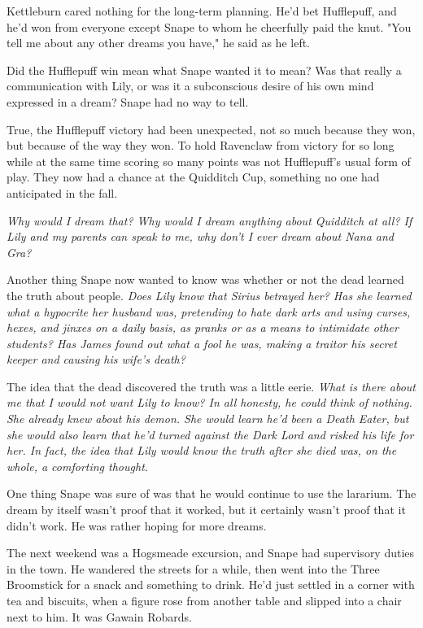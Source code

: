 \documentclass[a4paper,11pt]{article}
\begin{document}
Kettleburn cared nothing for the long-term planning. He'd bet Hufflepuff, and he'd won from everyone except Snape to whom he cheerfully paid the knut. "You tell me about any other dreams you have," he said as he left.

Did the Hufflepuff win mean what Snape wanted it to mean? Was that really a communication with Lily, or was it a subconscious desire of his own mind expressed in a dream? Snape had no way to tell.

True, the Hufflepuff victory had been unexpected, not so much because they won, but because of the way they won. To hold Ravenclaw from victory for so long while at the same time scoring so many points was not Hufflepuff's usual form of play. They now had a chance at the Quidditch Cup, something no one had anticipated in the fall.

\emph{Why would I dream that? Why would I dream anything about Quidditch at all? If Lily and my parents can speak to me, why don't I ever dream about Nana and Gra?}

Another thing Snape now wanted to know was whether or not the dead learned the truth about people. \emph{Does Lily know that Sirius betrayed her? Has she learned what a hypocrite her husband was, pretending to hate dark arts and using curses, hexes, and jinxes on a daily basis, as pranks or as a means to intimidate other students? Has James found out what a fool he was, making a traitor his secret keeper and causing his wife's death?}

The idea that the dead discovered the truth was a little eerie. \emph{What is there about me that I would not want Lily to know? In all honesty, he could think of nothing. She already knew about his demon. She would learn he'd been a Death Eater, but she would also learn that he'd turned against the Dark Lord and risked his life for her. In fact, the idea that Lily would know the truth after she died was, on the whole, a comforting thought.}

One thing Snape was sure of was that he would continue to use the lararium. The dream by itself wasn't proof that it worked, but it certainly wasn't proof that it didn't work. He was rather hoping for more dreams.

The next weekend was a Hogsmeade excursion, and Snape had supervisory duties in the town. He wandered the streets for a while, then went into the Three Broomstick for a snack and something to drink. He'd just settled in a corner with tea and biscuits, when a figure rose from another table and slipped into a chair next to him. It was Gawain Robards.
\end{document}
